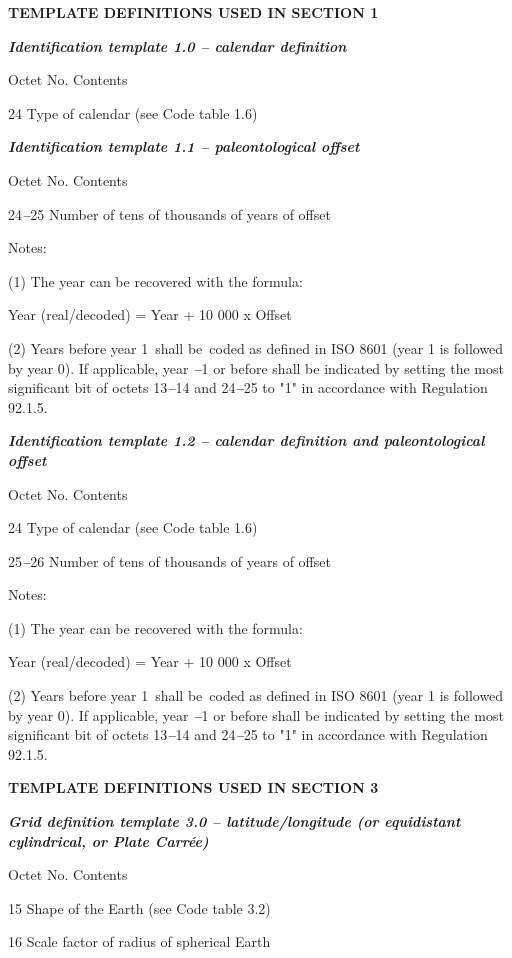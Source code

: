 \textbf{TEMPLATE DEFINITIONS USED IN SECTION 1}

\emph{\textbf{Identification template 1.0 -- calendar definition}}

Octet No. Contents

24 Type of calendar (see Code table 1.6)

\emph{\textbf{Identification template 1.1 -- paleontological offset}}

Octet No. Contents

24\emph{\textbf{--}}25 Number of tens of thousands of years of offset

Notes:

(1) The year can be recovered with the formula:

Year (real/decoded) = Year + 10 000 x Offset

(2) Years before year 1~shall be~coded as defined in ISO 8601 (year 1 is followed by year 0). If applicable, year \emph{\textbf{--}}1 or before shall be indicated by setting the most significant bit of octets 13\emph{\textbf{--}}14 and 24\emph{\textbf{--}}25 to "1" in accordance with Regulation 92.1.5.

\emph{\textbf{Identification template 1.2 -- calendar definition and paleontological offset}}

Octet No. Contents

24 Type of calendar (see Code table 1.6)

25\emph{\textbf{--}}26 Number of tens of thousands of years of offset

Notes:

(1) The year can be recovered with the formula:

Year (real/decoded) = Year + 10 000 x Offset

(2) Years before year 1~shall be~coded as defined in ISO 8601 (year 1 is followed by year 0). If applicable, year \emph{\textbf{--}}1 or before shall be indicated by setting the most significant bit of octets 13\emph{\textbf{--}}14 and 24\emph{\textbf{--}}25 to "1" in accordance with Regulation 92.1.5.

\textbf{TEMPLATE DEFINITIONS USED IN SECTION 3}

\emph{\textbf{Grid definition template 3.0 -- latitude/longitude (or equidistant cylindrical, or Plate Carrée)}}

Octet No. Contents

15 Shape of the Earth (see Code table 3.2)

16 Scale factor of radius of spherical Earth

